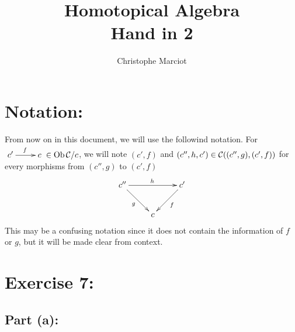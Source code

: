 \documentclass[11pt, a4paper, twoside]{article}
\begin{document}
\title{Homotopical Algebra\\ Hand in 2}
\author{Christophe Marciot}
\maketitle

\section*{Notation:}
From now on in this document, we will use the followind notation. For $\xymatrix{c'\ar[r]^{f} & c}\in\Ob\cC/c$, we will note $(c',f)$ and $(c'',h,c')\in\mathcal{C}((c'',g),(c',f))$ for every morphisms from $(c'',g)$ to $(c',f)$ 
\begin{displaymath}
	\xymatrix{
		c'' \ar[rd]_g \ar[rr]^h & & c' \ar[ld]^f\\
		& c
	}
\end{displaymath}
This may be a confusing notation since it does not contain the information of $f$ or $g$, but it will be made clear from context.

\section*{Exercise 7:}
\subsection*{Part (a):}
\end{document}
